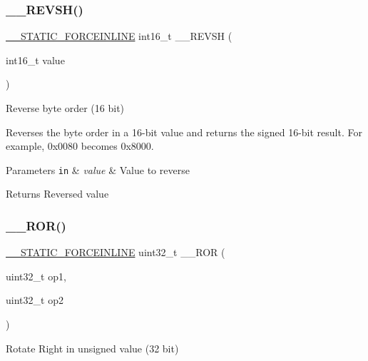 \subsubsection{\texorpdfstring{\+\_\+\+\_\+\+R\+E\+V\+S\+H()}{\_\_REVSH()}}
{\footnotesize\ttfamily \mbox{\hyperlink{cmsis__iccarm_8h_ab904513442afdf77d4f8c74f23cbb040}{\+\_\+\+\_\+\+S\+T\+A\+T\+I\+C\+\_\+\+F\+O\+R\+C\+E\+I\+N\+L\+I\+NE}} int16\+\_\+t \+\_\+\+\_\+\+R\+E\+V\+SH (\begin{DoxyParamCaption}\item[{int16\+\_\+t}]{value }\end{DoxyParamCaption})}



Reverse byte order (16 bit) 

Reverses the byte order in a 16-\/bit value and returns the signed 16-\/bit result. For example, 0x0080 becomes 0x8000. 
\begin{DoxyParams}[1]{Parameters}
\mbox{\tt in}  & {\em value} & Value to reverse \\
\hline
\end{DoxyParams}
\begin{DoxyReturn}{Returns}
Reversed value 
\end{DoxyReturn}
\mbox{\label{group___c_m_s_i_s___core___instruction_interface_gab16acb6456176f1e87a4f2724c2b6028}} 
\subsubsection{\texorpdfstring{\+\_\+\+\_\+\+R\+O\+R()}{\_\_ROR()}}
{\footnotesize\ttfamily \mbox{\hyperlink{cmsis__iccarm_8h_ab904513442afdf77d4f8c74f23cbb040}{\+\_\+\+\_\+\+S\+T\+A\+T\+I\+C\+\_\+\+F\+O\+R\+C\+E\+I\+N\+L\+I\+NE}} uint32\+\_\+t \+\_\+\+\_\+\+R\+OR (\begin{DoxyParamCaption}\item[{uint32\+\_\+t}]{op1,  }\item[{uint32\+\_\+t}]{op2 }\end{DoxyParamCaption})}



Rotate Right in unsigned value (32 bit) 

